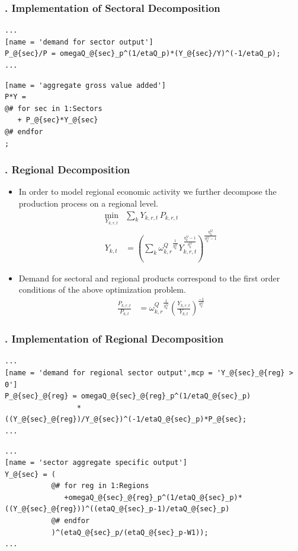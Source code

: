 \documentclass[11pt,aspectratio=169]{beamer}
\begin{document}
\begin{frame}[fragile]
\frametitle{{\thesection.\thesubsection} Implementation of Sectoral Decomposition}
\begin{lstlisting}[frame = single]
...
[name = 'demand for sector output']
P_@{sec}/P = omegaQ_@{sec}_p^(1/etaQ_p)*(Y_@{sec}/Y)^(-1/etaQ_p);
...
\end{lstlisting}

\begin{lstlisting}[frame = single]
[name = 'aggregate gross value added']
P*Y = 
@# for sec in 1:Sectors
   + P_@{sec}*Y_@{sec}
@# endfor
;
\end{lstlisting}

\end{frame}



\begin{frame}
\frametitle{{\thesection.\thesubsection} Regional Decomposition}
\scriptsize
\begin{itemize}
\item In order to model regional economic activity we further decompose the production process on a regional level.
\begin{align*}
\underset{Y_{k,r,t}}{\mathrm{min}} & \sum_{k} Y_{k,r,t} \, P_{k,r,t} \\ 
Y_{k,t} &= \left(\sum_{k} {\omega^{Q}_{k,r}}^{\frac{1}{\eta^Q_{k}}} Y_{k,r,t}^{\frac{\eta^Q_{k}-1}{\eta^Q_{k}}} \right)^{\frac{\eta^Q_{k}}{\eta^Q_{k}-1}}
\end{align*}
\item Demand for sectoral and regional products correspond to the first order conditions of the above optimization problem.
\begin{align*}
\frac{P_{k,r,t}}{P_{k,t}} &= {\omega^{Q}_{k,r}}^{\frac{1}{\eta^{Q}_{k}}} \left(\frac{Y_{k,r,t}}{Y_{k,t}}\right)^{\frac{-1}{\eta^{Q}_{k}}}
\end{align*}
\end{itemize}
\end{frame}

\begin{frame}[fragile]
\frametitle{{\thesection.\thesubsection} Implementation of Regional Decomposition}

\begin{lstlisting}[frame = single]
...
[name = 'demand for regional sector output',mcp = 'Y_@{sec}_@{reg} > 0']
P_@{sec}_@{reg} = omegaQ_@{sec}_@{reg}_p^(1/etaQ_@{sec}_p)
                 *((Y_@{sec}_@{reg})/Y_@{sec})^(-1/etaQ_@{sec}_p)*P_@{sec};
...
\end{lstlisting}

\begin{lstlisting}[frame = single]
...
[name = 'sector aggregate specific output']
Y_@{sec} = (
           @# for reg in 1:Regions
              +omegaQ_@{sec}_@{reg}_p^(1/etaQ_@{sec}_p)*((Y_@{sec}_@{reg}))^((etaQ_@{sec}_p-1)/etaQ_@{sec}_p)
           @# endfor
           )^(etaQ_@{sec}_p/(etaQ_@{sec}_p-W1));
...
\end{lstlisting}
\end{frame}
\end{document}
